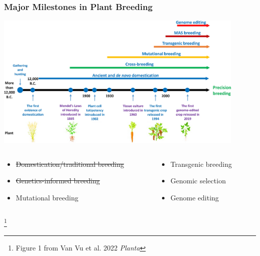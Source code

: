 \documentclass[xcolor=dvipsnames]{beamer}
\newcommand\blfootnote[1]{%
	\begingroup
	\renewcommand\thefootnote{}\footnote{#1}%
	\addtocounter{footnote}{-1}%
	\endgroup
}
\begin{document}
\begin{frame}
	\frametitle{Major Milestones in Plant Breeding}
	\centering	\includegraphics[keepaspectratio, width  = 0.9\textwidth]{img/timeLine}
	
	
	\begin{columns}
		\begin{column}{0.5\textwidth}
			\begin{itemize}
				\item[\textbf{1}] \st{Domestication/traditional breeding}
				\item[\textbf{2}] \st{Genetics-informed breeding}
				\item[\textbf{3}] Mutational breeding
			\end{itemize}
		\end{column}
		\begin{column}{0.5\textwidth}
			\begin{itemize}
				\item[\textbf{4}] Transgenic breeding
				\item[\textbf{5}] Genomic selection
				\item[\textbf{6}] Genome editing
			\end{itemize}
		\end{column}
	\end{columns}
	
	\blfootnote{Figure 1 from Van Vu et al. 2022 \textit{Planta}}
	
	
	
\end{frame}
\end{document}
